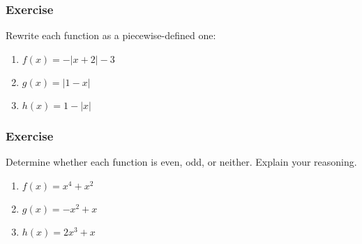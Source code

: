 \documentclass[12pt]{beamer}
\begin{document}
\begin{frame}
	\frametitle{Exercise}
	\vspace*{\fill}
	\vspace*{\fill}
	\initclock
	Rewrite each function as a piecewise-defined one:\\
	\vspace*{\fill}
	\vspace*{\fill}
	\begin{enumerate}
		\item $f(x) = -|x+2|-3$
		      \vspace*{\fill}
		\item $g(x) = |1-x|$
		      \vspace*{\fill}
		\item $h(x) = 1-|x|$
	\end{enumerate}
	\vspace*{\fill}
	\vspace*{\fill}
	\vspace*{\fill}
	\vspace*{\fill}
	\crono
\end{frame}
\begin{frame}
	\frametitle{Exercise}
	\vspace*{\fill}
	\vspace*{\fill}
	\vspace*{\fill}
	\initclock
	Determine whether each function is even, odd, or neither. Explain your reasoning.\\
	\vspace*{\fill}
	\begin{enumerate}
		\item $f(x) = x^4+x^2$
		\vspace*{\fill}
		\item $g(x) = -x^2+x$
		\vspace*{\fill}
		\item $h(x) = 2x^3+x$
	\end{enumerate}
	\vspace*{\fill}
	\vspace*{\fill}
	\vspace*{\fill}
	\vspace*{\fill}
	\crono
\end{frame}
\end{document}
